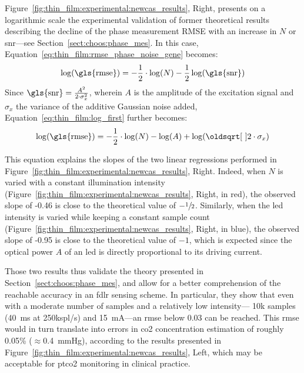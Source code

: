 Figure~\ref{fig:thin_film:experimental:newcas_results}, Right, presents on a logarithmic scale the experimental validation of former theoretical results describing the decline of the phase measurement RMSE with an increase in $N$ or \gls{snr}---see Section~\ref{sect:choos:phase_mes}. In this case, Equation~\ref{eq:thin_film:rmse_phase_noise_gene} becomes:
\begin{equation}\label{eq:thin_film:log_first}
	\log(\text{\gls{rmse}}) = -\frac{1}{2}\cdot \log(N) - \frac{1}{2}\log(\text{\gls{snr}})
\end{equation}
Since $\text{\gls{snr}} = \frac{A^2}{2\cdot \sigma_x^2}$, wherein $A$ is the amplitude of the excitation signal and $\sigma_x$ the variance of the additive Gaussian noise added, Equation~\ref{eq:thin_film:log_first} further becomes:
\begin{equation}\label{eq:thin_film:compact_rmse_A}
	\log(\text{\gls{rmse}}) = -\frac{1}{2}\cdot \log(N) - \log(A) + \log(\sqrt{2}\cdot \sigma_x)
\end{equation}

This equation explains the slopes of the two linear regressions performed in Figure~\ref{fig:thin_film:experimental:newcas_results}, Right. Indeed, when $N$ is varied with a constant illumination intensity (Figure~\ref{fig:thin_film:experimental:newcas_results}, Right, in red), the observed slope of -0.46 is close to the theoretical value of $-\sfrac{1}{2}$. Similarly, when the \gls{led} intensity is varied while keeping a constant sample count (Figure~\ref{fig:thin_film:experimental:newcas_results}, Right, in blue), the observed slope of -0.95 is close to the theoretical value of $-1$, which is expected since the optical power $A$ of an \gls{led} is directly proportional to its driving current.

Those two results thus validate the theory presented in Section~\ref{sect:choos:phase_mes}, and allow for a better comprehension of the reachable accuracy in an \gls{fdlr} sensing scheme. In particular, they show that even with a moderate number of samples and a relatively low intensity---\ie{} 10k samples (40~ms at 250kspl/s) and 15~mA---an \gls{rmse} below 0.03{\degree} can be reached. This \gls{rmse} would in turn translate into errors in \gls{co2} concentration estimation of roughly 0.05\% ($\approx$0.4~mmHg), according to the results presented in Figure~\ref{fig:thin_film:experimental:newcas_results}, Left, which may be acceptable for \gls{ptco2} monitoring in clinical practice\cite{conway2018}.

